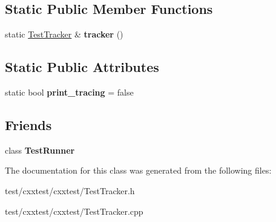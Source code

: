 \subsection*{Static Public Member Functions}
\begin{DoxyCompactItemize}
\item 
\hypertarget{classCxxTest_1_1TestTracker_a81a8b816f49e67208435a49294c56846}{static \hyperlink{classCxxTest_1_1TestTracker}{Test\-Tracker} \& {\bfseries tracker} ()}\label{classCxxTest_1_1TestTracker_a81a8b816f49e67208435a49294c56846}

\end{DoxyCompactItemize}
\subsection*{Static Public Attributes}
\begin{DoxyCompactItemize}
\item 
\hypertarget{classCxxTest_1_1TestTracker_afa43a5322213abfb0071752fd0dfdfaa}{static bool {\bfseries print\-\_\-tracing} = false}\label{classCxxTest_1_1TestTracker_afa43a5322213abfb0071752fd0dfdfaa}

\end{DoxyCompactItemize}
\subsection*{Friends}
\begin{DoxyCompactItemize}
\item 
\hypertarget{classCxxTest_1_1TestTracker_aef55eac6a104472bd865f4dd2a13d378}{class {\bfseries Test\-Runner}}\label{classCxxTest_1_1TestTracker_aef55eac6a104472bd865f4dd2a13d378}

\end{DoxyCompactItemize}


The documentation for this class was generated from the following files\-:\begin{DoxyCompactItemize}
\item 
test/cxxtest/cxxtest/Test\-Tracker.\-h\item 
test/cxxtest/cxxtest/Test\-Tracker.\-cpp\end{DoxyCompactItemize}
